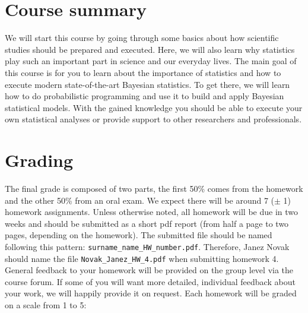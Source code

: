 \documentclass[fleqn,moreauthors,10pt]{ds_report}
\begin{document}
\flushbottom

\maketitle

\thispagestyle{empty}



\section*{Course summary}

We will start this course by going through some basics about how scientific studies should be prepared and executed. Here, we will also learn why statistics play such an important part in science and our everyday lives. The main goal of this course is for you to learn about the importance of statistics and how to execute modern state-of-the-art Bayesian statistics. To get there, we will learn how to do probabilistic programming and use it to build and apply Bayesian statistical models. With the gained knowledge you should be able to execute your own statistical analyses or provide support to other researchers and professionals.

\section*{Grading}

The final grade is composed of two parts, the first 50\% comes from the homework and the other 50\% from an oral exam. We expect there will be around 7 ($\pm$ 1) homework assignments. Unless otherwise noted, all homework will be due in two weeks and should be submitted as a short pdf report (from half a page to two pages, depending on the homework). The submitted file should be named following this pattern: \texttt{surname\_name\_HW\_number.pdf}. Therefore, Janez Novak should name the file \texttt{Novak\_Janez\_HW\_4.pdf} when submitting homework 4. General feedback to your homework will be provided on the group level via the course forum. If some of you will want more detailed, individual feedback about your work, we will happily provide it on request. Each homework will be graded on a scale from 1 to 5:
\end{document}

